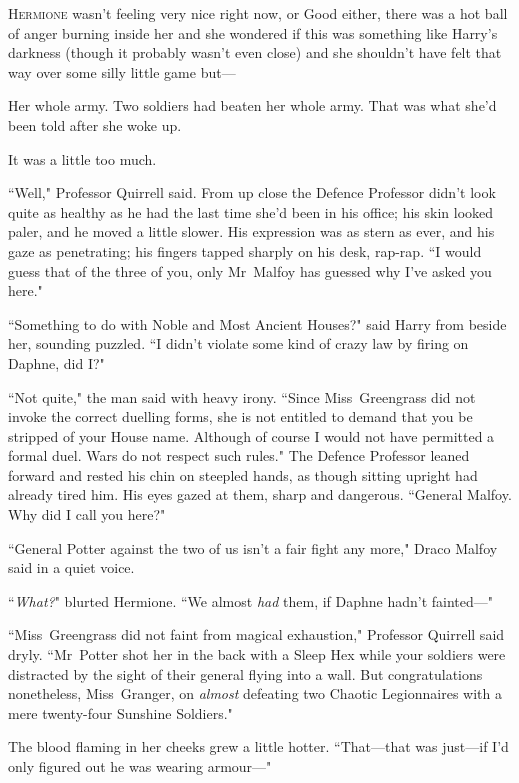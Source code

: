 
\lettrine{H}{ermione} wasn't feeling very nice right now, or Good either, there was a hot ball of anger burning inside her and she wondered if this was something like Harry's darkness (though it probably wasn't even close) and she shouldn't have felt that way over some silly little game but—

Her whole army. Two soldiers had beaten her whole army. That was what she'd been told after she woke up.

It was a little too much.

``Well," Professor Quirrell said. From up close the Defence Professor didn't look quite as healthy as he had the last time she'd been in his office; his skin looked paler, and he moved a little slower. His expression was as stern as ever, and his gaze as penetrating; his fingers tapped sharply on his desk, rap-rap. ``I would guess that of the three of you, only Mr~Malfoy has guessed why I've asked you here."

``Something to do with Noble and Most Ancient Houses?" said Harry from beside her, sounding puzzled. ``I didn't violate some kind of crazy law by firing on Daphne, did I?"

``Not quite," the man said with heavy irony. ``Since Miss~Greengrass did not invoke the correct duelling forms, she is not entitled to demand that you be stripped of your House name. Although of course I would not have permitted a formal duel. Wars do not respect such rules." The Defence Professor leaned forward and rested his chin on steepled hands, as though sitting upright had already tired him. His eyes gazed at them, sharp and dangerous. ``General Malfoy. Why did I call you here?"

``General Potter against the two of us isn't a fair fight any more," Draco Malfoy said in a quiet voice.

``\emph{What?}" blurted Hermione. ``We almost \emph{had} them, if Daphne hadn't fainted—"

``Miss~Greengrass did not faint from magical exhaustion," Professor Quirrell said dryly. ``Mr~Potter shot her in the back with a Sleep Hex while your soldiers were distracted by the sight of their general flying into a wall. But congratulations nonetheless, Miss~Granger, on \emph{almost} defeating two Chaotic Legionnaires with a mere twenty-four Sunshine Soldiers."

The blood flaming in her cheeks grew a little hotter. ``That—that was just—if I'd only figured out he was wearing armour—"

